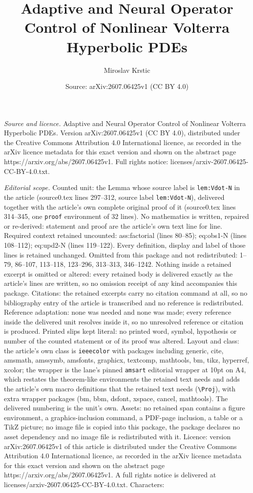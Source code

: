 \documentclass[10pt,a4paper]{amsart}
\title[Adaptive and Neural Operator Control of Nonlinear Volterra H]{Adaptive and Neural Operator Control of Nonlinear Volterra Hyperbolic PDEs}
\author{Miroslav Krstic}
\date{Source: arXiv:2607.06425v1 (CC BY 4.0)}
\begin{document}
\maketitle

\noindent\emph{Source and licence.} Adaptive and Neural Operator Control of Nonlinear Volterra Hyperbolic PDEs. Version arXiv:2607.06425v1 (CC BY 4.0), distributed under the Creative Commons Attribution 4.0 International licence, as recorded in the arXiv licence metadata for this exact version and shown on the abstract page https://arxiv.org/abs/2607.06425v1. Full rights notice: licenses/arxiv-2607.06425-CC-BY-4.0.txt.\par\smallskip

\noindent\textit{Editorial scope.} Counted unit: the Lemma whose source label is \texttt{lem:Vdot-N} in the article (source0.tex lines 297--312, source label \texttt{lem:Vdot-N}), delivered together with the article's own complete original proof of it (source0.tex lines 314--345, one \texttt{proof} environment of 32 lines). No mathematics is written, repaired or re-derived: statement and proof are the article's own text line for line. Required context retained uncounted: ass:factorial (lines 80--85); eq:obs1-N (lines 108--112); eq:upd2-N (lines 119--122). Every definition, display and label of those lines is retained unchanged. Omitted from this package and not redistributed: 1--79, 86--107, 113--118, 123--296, 313--313, 346--1242. Nothing inside a retained excerpt is omitted or altered: every retained body is delivered exactly as the article's lines are written, so no omission receipt of any kind accompanies this package. Citations: the retained excerpts carry no citation command at all, so no bibliography entry of the article is transcribed and no reference is redistributed. Reference adaptation: none was needed and none was made; every reference inside the delivered unit resolves inside it, so no unresolved reference or citation is produced. Printed slips kept literal: no printed word, symbol, hypothesis or number of the counted statement or of its proof was altered. Layout and class: the article's own class is \texttt{ieeecolor} with packages including generic, cite, amsmath, amssymb, amsfonts, graphicx, textcomp, mathtools, bm, tikz, hyperref, xcolor; the wrapper is the lane's pinned \texttt{amsart} editorial wrapper at 10pt on A4, which restates the theorem-like environments the retained text needs and adds the article's own macro definitions that the retained text needs (\texttt{\textbackslash Proj}), with extra wrapper packages (bm, bbm, dsfont, xspace, cancel, mathtools). The delivered numbering is the unit's own. Assets: no retained span contains a figure environment, a graphics-inclusion command, a PDF-page inclusion, a table or a TikZ picture; no image file is copied into this package, the package declares no asset dependency and no image file is redistributed with it. Licence: version arXiv:2607.06425v1 of this article is distributed under the Creative Commons Attribution 4.0 International licence, as recorded in the arXiv licence metadata for this exact version and shown on the abstract page https://arxiv.org/abs/2607.06425v1. A full rights notice is delivered at licenses/arxiv-2607.06425-CC-BY-4.0.txt. Characters: 
\end{document}
